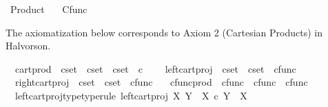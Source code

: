 %
\begin{isabellebody}%
%
%
\isadelimtheory
%
\endisadelimtheory
%
\isatagtheory
{}\isamarkupfalse%
\ Product\isanewline
\ \ \ Cfunc\isanewline
{}%
\endisatagtheory
{\isafoldtheory}%
%
\isadelimtheory
%
\endisadelimtheory
%
\isadelimdocument
%
\endisadelimdocument
%
\isatagdocument
%
\isamarkuptrue%
%
\endisatagdocument
{\isafolddocument}%
%
\isadelimdocument
%
\endisadelimdocument
%
\begin{isamarkuptext}%
The axiomatization below corresponds to Axiom 2 (Cartesian Products) in Halvorson.%
\end{isamarkuptext}\isamarkuptrue%
\isamarkupfalse%
\isanewline
\ \ cart{\isacharunderscore}{\kern0pt}prod\ {\isacharcolon}{\kern0pt}{\isacharcolon}{\kern0pt}\ {\isachardoublequoteopen}cset\ {\isasymRightarrow}\ cset\ {\isasymRightarrow}\ cset{\isachardoublequoteclose}\ {\isacharparenleft}{\kern0pt}\ {\isachardoublequoteopen}{\isasymtimes}\isactrlsub c{\isachardoublequoteclose}\ {}{}{\isacharparenright}{\kern0pt}\ \isanewline
\ \ left{\isacharunderscore}{\kern0pt}cart{\isacharunderscore}{\kern0pt}proj\ {\isacharcolon}{\kern0pt}{\isacharcolon}{\kern0pt}\ {\isachardoublequoteopen}cset\ {\isasymRightarrow}\ cset\ {\isasymRightarrow}\ cfunc{\isachardoublequoteclose}\ \isanewline
\ \ right{\isacharunderscore}{\kern0pt}cart{\isacharunderscore}{\kern0pt}proj\ {\isacharcolon}{\kern0pt}{\isacharcolon}{\kern0pt}\ {\isachardoublequoteopen}cset\ {\isasymRightarrow}\ cset\ {\isasymRightarrow}\ cfunc{\isachardoublequoteclose}\ \isanewline
\ \ cfunc{\isacharunderscore}{\kern0pt}prod\ {\isacharcolon}{\kern0pt}{\isacharcolon}{\kern0pt}\ {\isachardoublequoteopen}cfunc\ {\isasymRightarrow}\ cfunc\ {\isasymRightarrow}\ cfunc{\isachardoublequoteclose}\ {\isacharparenleft}{\kern0pt}{\isachardoublequoteopen}{\isasymlangle}{\isacharunderscore}{\kern0pt}{\isacharcomma}{\kern0pt}{\isacharunderscore}{\kern0pt}{\isasymrangle}{\isachardoublequoteclose}{\isacharparenright}{\kern0pt}\isanewline
{}\isanewline
\ \ left{\isacharunderscore}{\kern0pt}cart{\isacharunderscore}{\kern0pt}proj{\isacharunderscore}{\kern0pt}type{\isacharbrackleft}{\kern0pt}type{\isacharunderscore}{\kern0pt}rule{\isacharbrackright}{\kern0pt}{\isacharcolon}{\kern0pt}\ {\isachardoublequoteopen}left{\isacharunderscore}{\kern0pt}cart{\isacharunderscore}{\kern0pt}proj\ X\ Y\ {\isacharcolon}{\kern0pt}\ X\ {\isasymtimes}\isactrlsub c\ Y\ {\isasymrightarrow}\ X{\isachardoublequoteclose}\ \isanewline

\end{isabellebody}
